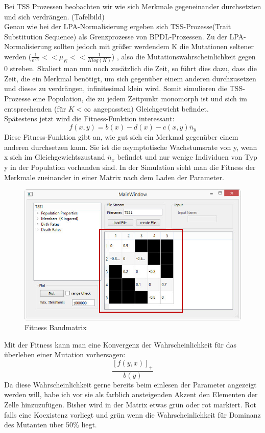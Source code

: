 \documentclass[11pt, a4paper, german]{article}
\begin{document}
Bei TSS Prozessen beobachten wir wie sich Merkmale gegeneinander durchsetzten und sich verdrängen. (Tafelbild)\\
Genau wie bei der LPA-Normalisierung ergeben sich TSS-Prozesse(Trait Substitution Sequence) als Grenzprozesse von BPDL-Prozessen. Zu der LPA-Normalisierung sollten jedoch mit größer werdendem K die Mutationen seltener werden ($ \frac{1}{e^{VK}} << \mu_K << \frac{1}{K log(K)} $) , also die Mutationswahrscheinlichkeit gegen 0 streben. Skaliert man nun noch zusätzlich die Zeit, so führt dies dazu, dass die Zeit, die ein Merkmal benötigt, um sich gegenüber einem anderen durchzusetzen und dieses zu verdrängen, infinitesimal klein wird. Somit simulieren die TSS-Prozesse eine Population, die zu jedem Zeitpunkt monomorph ist und sich im entsprechenden (für $ K < \infty $ angepassten) Gleichgewicht befindet.\\
Spätestens jetzt wird die Fitness-Funktion interessant:
\[ f(x,y) = b(x) - d(x) - c(x,y)\bar{n}_y \]
Diese Fitness-Funktion gibt an, wie gut sich ein Merkmal gegenüber einem anderen durchsetzen kann. Sie ist die asymptotische Wachstumsrate von y, wenn x sich im Gleichgewichtszustand $ \bar{n}_x $ befindet und nur wenige Individuen von Typ y in der Population vorhanden sind. In der Simulation sieht man die Fitness der Merkmale zueinander in einer Matrix nach dem Laden der Parameter.
\begin{figure}[H]
	\centering
	\includegraphics[width=0.7\linewidth]{./Pictures/MainWindow_BandMatrix}
	\caption[Fitness Matrix]{Fitness Bandmatrix}
	\label{MainWindow mit Fitness Bandmatrix}
\end{figure}
Mit der Fitness kann man eine Konvergenz der Wahrscheinlichkeit für das überleben einer Mutation vorhersagen:
\[ \frac{\left[ f(y,x)\right]_+ }{b(y)} \]
Da diese Wahrscheinlichkeit gerne bereits beim einlesen der Parameter angezeigt werden will, habe ich vor sie als farblich ansteigenden Akzent den Elementen der Zelle hinzuzufügen. Bisher wird in der Matrix etwas grün oder rot markiert. Rot falls eine Koexistenz vorliegt und grün wenn die Wahrscheinlichkeit für Dominanz des Mutanten über 50\% liegt.
\end{document}

